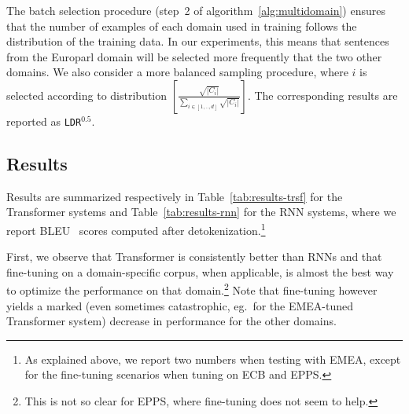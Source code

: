 The batch selection procedure (step~2 of algorithm~\ref{alg:multidomain}) ensures that the number of examples of each domain used in training  follows the distribution of the training data.
In our experiments, this means that sentences from the Europarl domain will be selected more frequently that the two other domains. We also consider a more balanced sampling procedure, where $i$ is selected according to  distribution $[\frac{\sqrt{|C_i|}}{\sum_{i\in [1,..,d]}\sqrt{|C_i|}}]$.
The corresponding results are reported as \texttt{LDR}$^{0.5}$.
\subsection{Results \label{ssec:results}}

Results are summarized respectively in Table~\ref{tab:results-trsf} for the Transformer systems and Table~\ref{tab:results-rnn} for the RNN systems, where we report BLEU~\cite{Papineni02bleu} scores computed after detokenization.\footnote{As explained above, we  report two numbers when testing with EMEA, except for the fine-tuning scenarios when tuning on ECB and EPPS.} %

First, we observe that Transformer is consistently better than RNNs and that fine-tuning on a domain-specific corpus, when applicable, is almost the best way to optimize the performance on that domain.\footnote{This is not so clear for EPPS, where fine-tuning does not seem to help.}  
Note that fine-tuning however yields a marked (even sometimes catastrophic, eg.\ for the EMEA-tuned Transformer system) decrease in performance for the other domains. 

